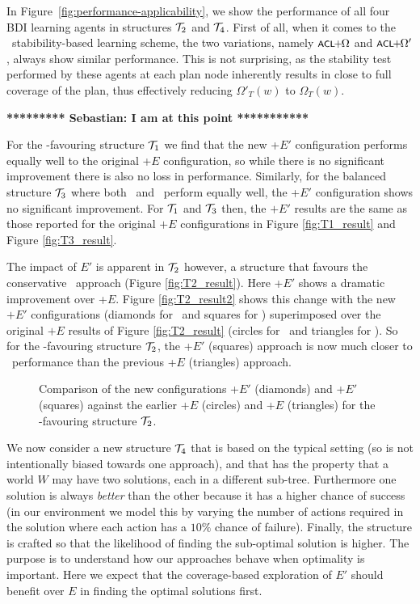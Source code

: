 In Figure~\ref{fig:performance-applicability}, we show the performance of all
four BDI learning agents in structures $\T_2$ and $\T_4$.
First of all, when it comes to the \BUL\ stabibility-based learning scheme, the
two variations, namely $\BULSELA$ and $\BULSELB$, always show similar
performance.
This is not surprising, as the stability test performed by these agents at each
plan node inherently results in close to full coverage of the plan, thus
effectively reducing $\Omega'_T(w)$ to $\Omega_T(w)$.

\textbf{********* Sebastian: I am at this point ***********}


For the \CL-favouring structure ${\mathcal{T}}_1$ we find that the new \CL+$E'$
configuration performs equally well to the original \CL+$E$
configuration, so while there is no significant improvement there is
also no loss in performance. Similarly, for the balanced structure
${\mathcal{T}}_3$ where both \CL\ and \BUL\ perform equally well, the \CL+$E'$
configuration shows no significant improvement. For ${\mathcal{T}}_1$ and ${\mathcal{T}}_3$
then, the $+E'$ results are the same as those reported for the
original $+E$ configurations in Figure \ref{fig:T1_result} and Figure
\ref{fig:T3_result}. 

The impact of $E'$ is apparent in $\T_2$ however, a structure that
favours the conservative \BUL\ approach (Figure
\ref{fig:T2_result}). Here \CL+$E'$ shows a dramatic improvement over
\CL+$E$. Figure \ref{fig:T2_result2} shows this change with the new
$+E'$ configurations (diamonds for \BUL\ and squares for \CL)
superimposed over the original $+E$ results of Figure
\ref{fig:T2_result} (circles for \BUL\ and triangles for \CL). So for
the \BUL-favouring structure $\T_2$, the \CL+$E'$ (squares) approach
is now much closer to \BUL\ performance than the previous \CL+$E$
(triangles) approach. 


\begin{figure*}[t]
\begin{center}
\subfigure[Structure $\T_2$]{\label{fig:T2_result2}

}
\qquad
\subfigure[Structure $\T_4$]{\label{fig:T4_result}

}

\caption{Comparison of the new configurations \BUL+$E'$ (diamonds) and \CL+$E'$
(squares) against the earlier \BUL+$E$ (circles) and \CL+$E$ (triangles) for the
\BUL-favouring structure $\T_2$.}
\end{center}
\end{figure*}


We now consider a new structure $\T_4$ that is based on the typical setting (so
is not intentionally biased towards one approach), and that has the property that
a world $W$ may have two solutions, each in a different sub-tree. Furthermore one
solution is always \textit{better} than the other because it has a higher chance
of success (in our environment we model this by varying the number of actions
required in the solution where each action has a $10\%$ chance of failure).
Finally, the structure is crafted so that the likelihood of finding the
sub-optimal solution is higher. The purpose is to understand how our approaches
behave when optimality is important. Here we expect that the coverage-based
exploration of $E'$ should benefit over $E$ in finding the optimal solutions
first.


